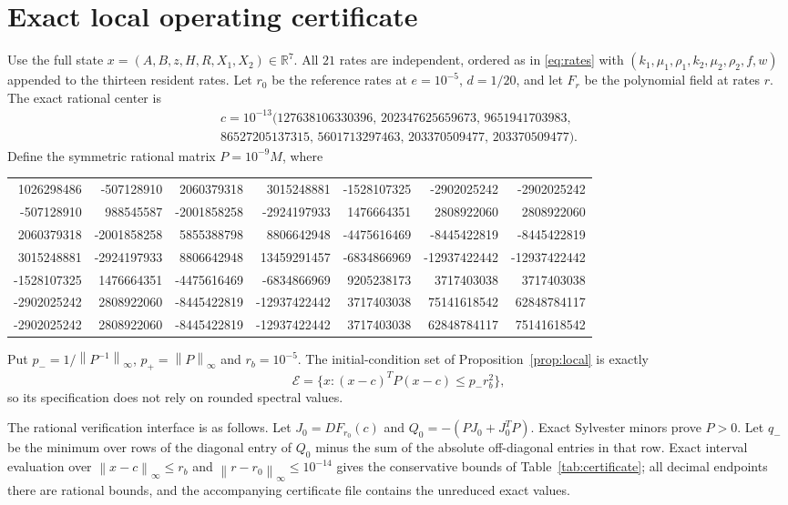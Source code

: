 \documentclass[11pt,a4paper]{article}
\theoremstyle{plain}
\theoremstyle{definition}
\theoremstyle{remark}
\newcommand{\R}{\mathbb R}
\newcommand{\cE}{\mathcal E}
\newcommand{\norm}[1]{\left\lVert#1\right\rVert}
\begin{document}
\section{Exact local operating certificate}\label{app:local}
Use the full state $x=(A,B,z,H,R,X_1,X_2)\in\R^7$. All $21$ rates are independent, ordered as in \eqref{eq:rates} with $(k_1,\mu_1,\rho_1,k_2,\mu_2,\rho_2,f,w)$ appended to the thirteen resident rates. Let $r_0$ be the reference rates at $e=10^{-5}$, $d=1/20$, and let $F_r$ be the polynomial field at rates $r$. The exact rational center is
\[
\begin{gathered}
c=10^{-13}(127638106330396,\,202347625659673,\,9651941703983,\\
86527205137315,\,5601713297463,\,203370509477,\,203370509477).
\end{gathered}
\]
Define the symmetric rational matrix $P=10^{-9}M$, where
\begin{center}\scriptsize
\setlength{\tabcolsep}{3pt}
\begin{tabular}{rrrrrrr}
1026298486&-507128910&2060379318&3015248881&-1528107325&-2902025242&-2902025242\\
-507128910&988545587&-2001858258&-2924197933&1476664351&2808922060&2808922060\\
2060379318&-2001858258&5855388798&8806642948&-4475616469&-8445422819&-8445422819\\
3015248881&-2924197933&8806642948&13459291457&-6834866969&-12937422442&-12937422442\\
-1528107325&1476664351&-4475616469&-6834866969&9205238173&3717403038&3717403038\\
-2902025242&2808922060&-8445422819&-12937422442&3717403038&75141618542&62848784117\\
-2902025242&2808922060&-8445422819&-12937422442&3717403038&62848784117&75141618542
\end{tabular}
\end{center}
Put $p_-=1/\norm{P^{-1}}_\infty$, $p_+=\norm P_\infty$ and $r_b=10^{-5}$. The initial-condition set of Proposition~\ref{prop:local} is exactly
\begin{equation}\label{eq:ellipsoid}
\cE=\{x:(x-c)^TP(x-c)\le p_-r_b^2\},
\end{equation}
so its specification does not rely on rounded spectral values.

The rational verification interface is as follows. Let $J_0=DF_{r_0}(c)$ and $Q_0=-(PJ_0+J_0^TP)$. Exact Sylvester minors prove $P>0$. Let $q_-$ be the minimum over rows of the diagonal entry of $Q_0$ minus the sum of the absolute off-diagonal entries in that row. Exact interval evaluation over $\norm{x-c}_\infty\le r_b$ and $\norm{r-r_0}_\infty\le10^{-14}$ gives the conservative bounds of Table~\ref{tab:certificate}; all decimal endpoints there are rational bounds, and the accompanying certificate file contains the unreduced exact values.
\end{document}

